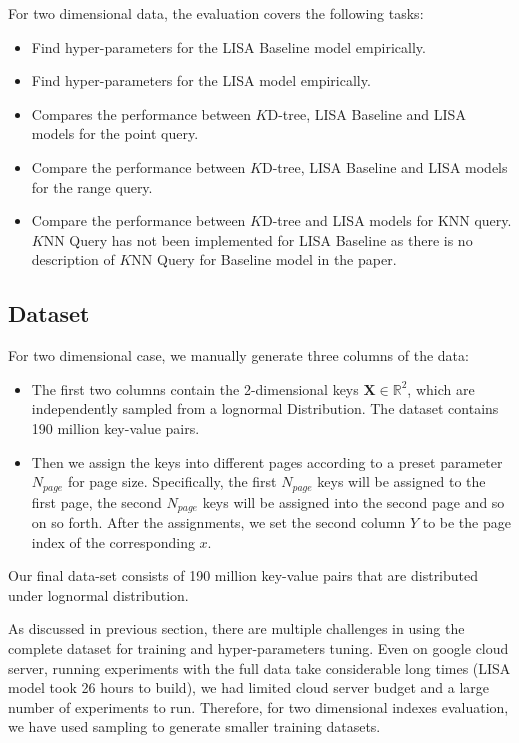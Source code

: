 For two dimensional data, the evaluation covers the following tasks:

\begin{itemize}
 	\item Find hyper-parameters for the LISA Baseline model empirically.
	\item Find hyper-parameters for the LISA model empirically.
	\item Compares the performance between $K$D-tree, LISA Baseline and LISA models for the point query.
	\item Compare the performance between $K$D-tree, LISA Baseline and LISA models for the range query.
	\item Compare the performance between $K$D-tree and LISA models for KNN query. $K$NN Query has not been implemented for LISA Baseline as there is no description of $K$NN Query for Baseline model in the paper. 
\end{itemize}

\subsection{Dataset}

For two dimensional case, we manually generate three columns of the data:

\begin{itemize}
	\item The first two columns contain the  2-dimensional keys $\boldsymbol{X} \in \mathbb{R}^{2}$, which are independently sampled from a lognormal Distribution. The dataset contains 190 million key-value pairs.
	\item Then we assign the keys into different pages according to a preset parameter $N_{page}$ for page size. Specifically, the first $N_{page}$ keys will be assigned to the first page, the second $N_{page}$ keys will be assigned into the second page and so on so forth. After the assignments, we set the second column $Y$ to be the page index of the corresponding $x$.
\end{itemize}

Our final data-set consists of 190 million key-value pairs that are distributed under lognormal distribution.

As discussed in previous section, there are multiple challenges in using the complete dataset for training and hyper-parameters tuning. Even on google cloud server, running experiments with the full data take considerable long times (LISA model took 26 hours to build), we had limited cloud server budget and a large number of experiments to run. Therefore, for two dimensional indexes evaluation, we have used sampling to generate smaller training datasets.   

